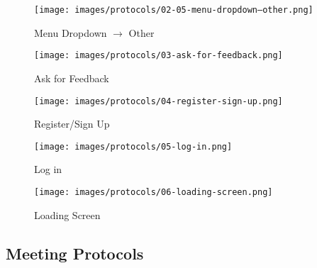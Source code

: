 \documentclass[a4paper, 12pt]{article}
\begin{document}
\begin{figure} [htbp]
  \begin{center}
    \texttt{[image: images/protocols/02-05-menu-dropdown--other.png]}
  \end{center}
  \caption{Menu Dropdown $\rightarrow$ Other}
\end{figure}

\begin{figure} [htbp]
  \begin{center}
    \texttt{[image: images/protocols/03-ask-for-feedback.png]}
  \end{center}
  \caption{Ask for Feedback}
\end{figure}

\begin{figure} [htbp]
  \begin{center}
    \texttt{[image: images/protocols/04-register-sign-up.png]}
  \end{center}
  \caption{Register/Sign Up}
\end{figure}

\begin{figure} [htbp]
  \begin{center}
    \texttt{[image: images/protocols/05-log-in.png]}
  \end{center}
  \caption{Log in}
\end{figure}

\begin{figure} [htbp]
  \begin{center}
    \texttt{[image: images/protocols/06-loading-screen.png]}
  \end{center}
  \caption{Loading Screen}
\end{figure}

\newpage
\subsection{Meeting Protocols}
\end{document}
